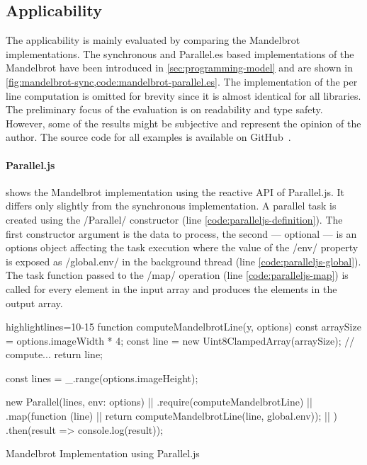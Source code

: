 \subsection{Applicability}
The applicability is mainly evaluated by comparing the Mandelbrot implementations. The synchronous and Parallel.es based implementations of the Mandelbrot have been introduced in \cref{sec:programming-model} and are shown in \cref{fig:mandelbrot-sync,code:mandelbrot-parallel.es}. The implementation of the per line computation is omitted for brevity since it is almost identical for all libraries. The preliminary focus of the evaluation is on readability and type safety. However, some of the results might be subjective and represent the opinion of the author. The source code for all examples is available on GitHub~\cite{Reiser2016}. 

\paragraph{Parallel.js}
 shows the Mandelbrot implementation using the reactive API of Parallel.js. It differs only slightly from the synchronous implementation. A parallel task is created using the \javascriptinline/Parallel/ constructor (line \ref{code:paralleljs-definition}). The first constructor argument is the data to process, the second --- optional ---  is an options object affecting the task execution where the value of the \javascriptinline/env/ property is exposed as \javascriptinline/global.env/ in the background thread (line \ref{code:paralleljs-global}). The task function passed to the \javascriptinline/map/ operation (line \ref{code:paralleljs-map}) is called for every element in the input array and produces the elements in the output array.

\begin{listing}
	\begin{javascriptcode*}{highlightlines={10-15}}
function computeMandelbrotLine(y, options) {
	const arraySize = options.imageWidth * 4;
	const line = new Uint8ClampedArray(arraySize);
	// compute...
	return line;
}

const lines = _.range(options.imageHeight);

new Parallel(lines, {env: options}) |$\label{code:paralleljs-definition}$|
	.require(computeMandelbrotLine)  |$\label{code:paralleljs-require}$|
	.map(function (line) { |$\label{code:paralleljs-map}$|
		return computeMandelbrotLine(line, global.env)); |$\label{code:paralleljs-global}$|
	})
	.then(result => console.log(result));
\end{javascriptcode*}

\caption{Mandelbrot Implementation using Parallel.js}
\label{fig:mandelbrot-paralleljs}
\end{listing}


